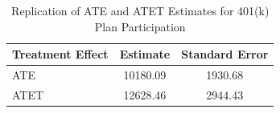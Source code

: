\begin{table}[h]
\centering
\caption{Replication of ATE and ATET Estimates for 401(k) Plan Participation}
\begin{tabular}{lcc}
\toprule
Treatment Effect & Estimate & Standard Error \\
\midrule
ATE & 10180.09 & 1930.68 \\
ATET & 12628.46 & 2944.43 \\
\bottomrule
\end{tabular}
\label{tab:main}
\end{table}
